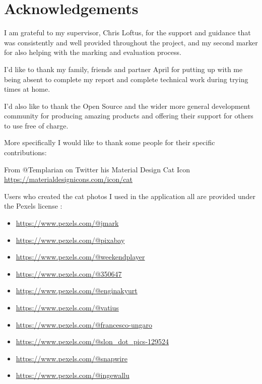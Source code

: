 \thispagestyle{empty}


\section*{\centering Acknowledgements}


I am grateful to my supervisor, Chris Loftus, for the support and guidance that was consistently and well provided throughout the project, and my second marker for also helping with the marking and evaluation process.

I'd like to thank my family, friends and partner April for putting up with me being absent to complete my report and complete technical work during trying times at home.

I'd also like to thank the Open Source and the wider more general development community for producing amazing products and offering their support for others to use free of charge.

More specifically I would like to thank some people for their specific contributions:

From @Templarian on Twitter his Material Design Cat Icon \url{https://materialdesignicons.com/icon/cat}

Users who created the cat photos I used in the application all are provided under the Pexels license \cite{PEXELSLICENSE}:
\begin{itemize}
    \item \url{https://www.pexels.com/@jmark}
    \item \url{https://www.pexels.com/@pixabay}
    \item \url{https://www.pexels.com/@weekendplayer}
    \item \url{https://www.pexels.com/@350647}
    \item \url{https://www.pexels.com/@enginakyurt}
    \item \url{https://www.pexels.com/@vatius}
    \item \url{https://www.pexels.com/@francesco-ungaro}
    \item \url{https://www.pexels.com/@slon_dot_pics-129524}
    \item \url{https://www.pexels.com/@snapwire}
    \item \url{https://www.pexels.com/@ingewallu}
\end{itemize}

    
        
